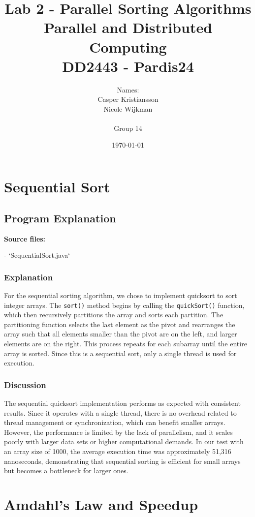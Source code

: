 \documentclass{article}
\title{\textbf{Lab 2 - Parallel Sorting Algorithms\\Parallel and Distributed Computing\\DD2443 - Pardis24}}
\author{Names:\\Casper Kristiansson\\Nicole Wijkman\\\\Group 14}
\date{\today}
\begin{document}
\setlength\parindent{0pt}
\setlength{\parskip}{\bigskipamount}

\maketitle

\newpage
\section{Sequential Sort}

\subsection{Program Explanation}
\textbf{Source files:}

- `SequentialSort.java`

\subsubsection{Explanation}
For the sequential sorting algorithm, we chose to implement quicksort to sort integer arrays. The \texttt{sort()} method begins by calling the \texttt{quickSort()} function, which then recursively partitions the array and sorts each partition. The partitioning function selects the last element as the pivot and rearranges the array such that all elements smaller than the pivot are on the left, and larger elements are on the right. This process repeats for each subarray until the entire array is sorted. Since this is a sequential sort, only a single thread is used for execution.

\subsubsection{Discussion}
The sequential quicksort implementation performs as expected with consistent results. Since it operates with a single thread, there is no overhead related to thread management or synchronization, which can benefit smaller arrays. However, the performance is limited by the lack of parallelism, and it scales poorly with larger data sets or higher computational demands. In our test with an array size of 1000, the average execution time was approximately 51,316 nanoseconds, demonstrating that sequential sorting is efficient for small arrays but becomes a bottleneck for larger ones.

\newpage
\section{Amdahl’s Law and Speedup}
\end{document}
